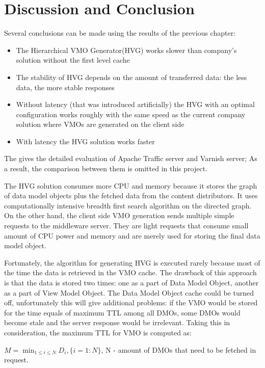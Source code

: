 \newpage
\section{Discussion and Conclusion}
	
Several conclusions can be made using the results of the previous chapter: 

\begin{itemize}
	\item The Hierarchical VMO Generator(HVG) works slower than company's solution without the first level cache
	\item The stability of HVG depends on the amount of transferred data: the less data, the more stable responses
	\item Without latency (that was introduced artificially) the HVG with an optimal configuration works roughly with the same speed as the current company solution where VMOs are generated on the client side
	\item With latency the HVG solution works faster 
\end{itemize}

The \cite{VarnApacheReverse} gives the detailed evaluation of Apache Traffic server and Varnish server; As a result, the comparison between them is omitted in this project. 

The HVG solution consumes more CPU and memory because it stores the graph of data model objects plus the fetched data from the content distributors. It uses computationally intensive breadth first search algorithm on the directed graph. On the other hand, the client side VMO generation sends multiple simple requests to the middleware server. They are light requests that consume small amount of CPU power and memory and are merely used for storing the final data model object.

Fortunately, the algorithm for generating HVG is executed rarely because most of the time the data is retrieved in the VMO cache. The drawback of this approach is that the data is stored two times: one as a part of Data Model Object, another as a part of View Model Object. The Data Model Object cache could be turned off, unfortunately this will give additional problems: if the VMO would be stored for the time equals of maximum TTL among all DMOs, some DMOs would become stale and the server response would be irrelevant. Taking this in consideration, the maximum TTL for VMO is computed as:

\begin{center}
	\begin{math}M = \min_{1 \leq i \leq N} D_{i},\{i=1:N\}\end{math}, N - amount of DMOs that need to be fetched in request.
\end{center}

